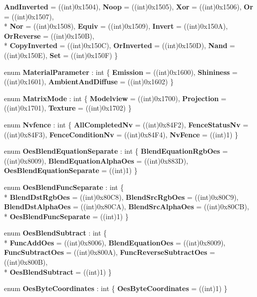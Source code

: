 \begin{DoxyCompactItemize}
{\bfseries And\-Inverted} = ((int)0x1504), 
{\bfseries Noop} = ((int)0x1505), 
{\bfseries Xor} = ((int)0x1506), 
{\bfseries Or} = ((int)0x1507), 
\\*
{\bfseries Nor} = ((int)0x1508), 
{\bfseries Equiv} = ((int)0x1509), 
{\bfseries Invert} = ((int)0x150\-A), 
{\bfseries Or\-Reverse} = ((int)0x150\-B), 
\\*
{\bfseries Copy\-Inverted} = ((int)0x150\-C), 
{\bfseries Or\-Inverted} = ((int)0x150\-D), 
{\bfseries Nand} = ((int)0x150\-E), 
{\bfseries Set} = ((int)0x150\-F)
 \}
\item 
enum {\bfseries Material\-Parameter} \-: int \{ {\bfseries Emission} = ((int)0x1600), 
{\bfseries Shininess} = ((int)0x1601), 
{\bfseries Ambient\-And\-Diffuse} = ((int)0x1602)
 \}
\item 
enum {\bfseries Matrix\-Mode} \-: int \{ {\bfseries Modelview} = ((int)0x1700), 
{\bfseries Projection} = ((int)0x1701), 
{\bfseries Texture} = ((int)0x1702)
 \}
\item 
enum {\bfseries Nvfence} \-: int \{ {\bfseries All\-Completed\-Nv} = ((int)0x84\-F2), 
{\bfseries Fence\-Status\-Nv} = ((int)0x84\-F3), 
{\bfseries Fence\-Condition\-Nv} = ((int)0x84\-F4), 
{\bfseries Nv\-Fence} = ((int)1)
 \}
\item 
enum {\bfseries Oes\-Blend\-Equation\-Separate} \-: int \{ {\bfseries Blend\-Equation\-Rgb\-Oes} = ((int)0x8009), 
{\bfseries Blend\-Equation\-Alpha\-Oes} = ((int)0x883\-D), 
{\bfseries Oes\-Blend\-Equation\-Separate} = ((int)1)
 \}
\item 
enum {\bfseries Oes\-Blend\-Func\-Separate} \-: int \{ \\*
{\bfseries Blend\-Dst\-Rgb\-Oes} = ((int)0x80\-C8), 
{\bfseries Blend\-Src\-Rgb\-Oes} = ((int)0x80\-C9), 
{\bfseries Blend\-Dst\-Alpha\-Oes} = ((int)0x80\-C\-A), 
{\bfseries Blend\-Src\-Alpha\-Oes} = ((int)0x80\-C\-B), 
\\*
{\bfseries Oes\-Blend\-Func\-Separate} = ((int)1)
 \}
\item 
enum {\bfseries Oes\-Blend\-Subtract} \-: int \{ \\*
{\bfseries Func\-Add\-Oes} = ((int)0x8006), 
{\bfseries Blend\-Equation\-Oes} = ((int)0x8009), 
{\bfseries Func\-Subtract\-Oes} = ((int)0x800\-A), 
{\bfseries Func\-Reverse\-Subtract\-Oes} = ((int)0x800\-B), 
\\*
{\bfseries Oes\-Blend\-Subtract} = ((int)1)
 \}
\item 
enum {\bfseries Oes\-Byte\-Coordinates} \-: int \{ {\bfseries Oes\-Byte\-Coordinates} = ((int)1)
 \}
\item 

\end{DoxyCompactItemize}
